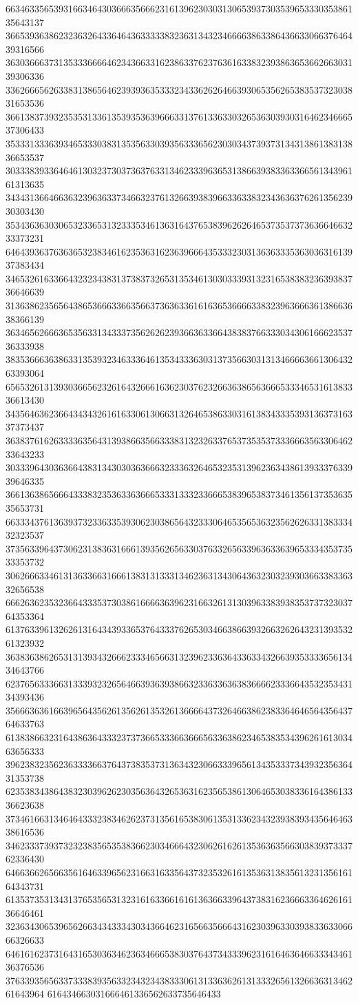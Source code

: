 66346335653931663464303666356662316139623030313065393730353965333035386135643137
36653936386232363264336464363333383236313432346666386338643663306637646439316566
36303666373135333666646234366331623863376237636163383239386365366266303139306336
33626665626338313865646239393635333234336262646639306535626538353732303831653536
36613837393235353133613539353639666331376133633032653630393031646234666537306433
35333133363934653330383135356330393563336562303034373937313431386138313836653537
30333839336464613032373037363763313462333963653138663938336336656134396161313635
34343136646636323963633734663237613266393839663363383234363637626135623930303430
35343636303065323365313233353461363164376538396262646537353737363664663233373231
64643936376363653238346162353631623639666435333230313636333536303631613937383434
34653261633664323234383137383732653135346130303339313231653838323639383736646639
31363862356564386536663366356637363633616163653666633832396366636138663638366139
36346562666365356331343337356262623936636336643838376633303430616662353736333938
38353666363863313539323463336461353433363031373566303131346666366130643263393064
65653261313930366562326164326661636230376232663638656366653334653161383336613430
34356463623664343432616163306130663132646538633031613834333539313637316337373437
36383761626333363564313938663566333831323263376537353537333666356330646233643233
30333964303636643831343030363666323336326465323531396236343861393337633939646335
36613638656664333832353633636665333133323366653839653837346135613735363535653731
66333437613639373233633539306230386564323330646535653632356262633138333432323537
37356339643730623138363166613935626563303763326563396363363965333435373533353732
30626663346131363366316661383131333134623631343064363230323930366338336332656538
66626362353236643335373038616666363962316632613130396338393835373732303764353364
61376339613262613164343933653764333762653034663866393266326264323139353261323932
36383638626531313934326662333465663132396233636433633432663935333365613434643766
62376563336631333932326564663936393866323363363638366662333664353235343134393436
35666363616639656435626135626135326136666437326466386238336464656435643764633763
61383866323164386364333237373665333663666563363862346538353439626161303463656333
39623832356236333366376437383537313634323066333965613435333734393235636431353738
62353834386438323039626230356364326536316235653861306465303833616438613336623638
37346166313464643332383462623731356165383061353133623432393839343564646338616536
34623337393732323835653538366230346664323062616261353636356630383937333762336430
64663662656635616463396562316631633564373235326161353631383561323135616164343731
61353735313431376535653132316163366161613636633964373831623666336462616136646461
32363430653965626634343334303436646231656635666431623039633039383363306666326633
64616162373164316530363462363466653830376437343339623161646364663334346136376536
37633935656337333839356332343234383330613133636261313332656132663631346261643964
616434663031666461336562633735646433
